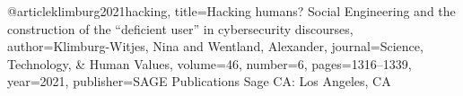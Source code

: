 @article{klimburg2021hacking,
  title={Hacking humans? Social Engineering and the construction of the “deficient user” in cybersecurity discourses},
  author={Klimburg-Witjes, Nina and Wentland, Alexander},
  journal={Science, Technology, \& Human Values},
  volume={46},
  number={6},
  pages={1316--1339},
  year={2021},
  publisher={SAGE Publications Sage CA: Los Angeles, CA}
}